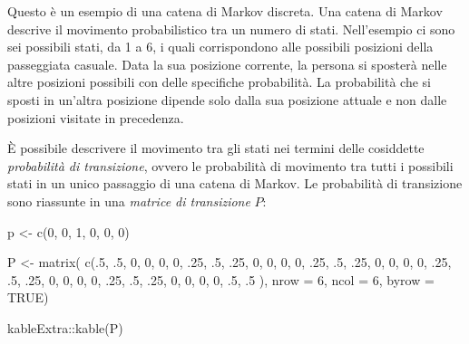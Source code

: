\documentclass[
]{memoir}
\newenvironment{Shaded}{\begin{snugshade}}{\end{snugshade}}
\newcommand{\AttributeTok}[1]{\textcolor[rgb]{0.77,0.63,0.00}{#1}}
\newcommand{\ConstantTok}[1]{\textcolor[rgb]{0.00,0.00,0.00}{#1}}
\newcommand{\DecValTok}[1]{\textcolor[rgb]{0.00,0.00,0.81}{#1}}
\newcommand{\FunctionTok}[1]{\textcolor[rgb]{0.00,0.00,0.00}{#1}}
\newcommand{\NormalTok}[1]{#1}
\newcommand{\OtherTok}[1]{\textcolor[rgb]{0.56,0.35,0.01}{#1}}
\newcommand{\SpecialCharTok}[1]{\textcolor[rgb]{0.00,0.00,0.00}{#1}}
\begin{document}
Questo è un esempio di una catena di Markov discreta. Una catena di Markov descrive il movimento probabilistico tra un numero di stati. Nell'esempio ci sono sei possibili stati, da 1 a 6, i quali corrispondono alle possibili posizioni della passeggiata casuale. Data la sua posizione corrente, la persona si sposterà nelle altre posizioni possibili con delle specifiche probabilità. La probabilità che si sposti in un'altra posizione dipende solo dalla sua posizione attuale e non dalle posizioni visitate in precedenza.

È possibile descrivere il movimento tra gli stati nei termini delle cosiddette \emph{probabilità di transizione}, ovvero le probabilità di movimento tra tutti i possibili stati in un unico passaggio di una catena di Markov. Le probabilità di transizione sono riassunte in una \emph{matrice di transizione} \(P\):

\begin{Shaded}
\begin{Highlighting}[]
\NormalTok{p }\OtherTok{\textless{}{-}} \FunctionTok{c}\NormalTok{(}\DecValTok{0}\NormalTok{, }\DecValTok{0}\NormalTok{, }\DecValTok{1}\NormalTok{, }\DecValTok{0}\NormalTok{, }\DecValTok{0}\NormalTok{, }\DecValTok{0}\NormalTok{)}

\NormalTok{P }\OtherTok{\textless{}{-}} \FunctionTok{matrix}\NormalTok{(}
  \FunctionTok{c}\NormalTok{(.}\DecValTok{5}\NormalTok{, .}\DecValTok{5}\NormalTok{, }\DecValTok{0}\NormalTok{, }\DecValTok{0}\NormalTok{, }\DecValTok{0}\NormalTok{, }\DecValTok{0}\NormalTok{,}
\NormalTok{    .}\DecValTok{25}\NormalTok{, .}\DecValTok{5}\NormalTok{, .}\DecValTok{25}\NormalTok{, }\DecValTok{0}\NormalTok{, }\DecValTok{0}\NormalTok{, }\DecValTok{0}\NormalTok{,}
    \DecValTok{0}\NormalTok{, .}\DecValTok{25}\NormalTok{, .}\DecValTok{5}\NormalTok{, .}\DecValTok{25}\NormalTok{, }\DecValTok{0}\NormalTok{, }\DecValTok{0}\NormalTok{,}
    \DecValTok{0}\NormalTok{, }\DecValTok{0}\NormalTok{, .}\DecValTok{25}\NormalTok{, .}\DecValTok{5}\NormalTok{, .}\DecValTok{25}\NormalTok{, }\DecValTok{0}\NormalTok{,}
    \DecValTok{0}\NormalTok{, }\DecValTok{0}\NormalTok{, }\DecValTok{0}\NormalTok{, .}\DecValTok{25}\NormalTok{, .}\DecValTok{5}\NormalTok{, .}\DecValTok{25}\NormalTok{,}
    \DecValTok{0}\NormalTok{, }\DecValTok{0}\NormalTok{, }\DecValTok{0}\NormalTok{, }\DecValTok{0}\NormalTok{, .}\DecValTok{5}\NormalTok{, .}\DecValTok{5}
\NormalTok{    ),}
  \AttributeTok{nrow =} \DecValTok{6}\NormalTok{, }\AttributeTok{ncol =} \DecValTok{6}\NormalTok{, }\AttributeTok{byrow =} \ConstantTok{TRUE}\NormalTok{)}

\NormalTok{kableExtra}\SpecialCharTok{::}\FunctionTok{kable}\NormalTok{(P)}
\end{Highlighting}
\end{Shaded}
\end{document}

